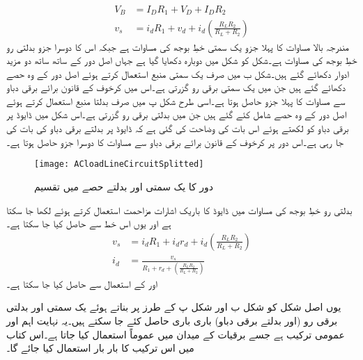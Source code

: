 \begin{align} \label{مساوات_ٹرانزسٹر_یکسمتی_بدلتا_بار_کے_خط}
V_B&=I_D R_1 +V_D+I_D R_2\\
v_s&=i_d R_1+v_d+i_d \left (\frac{R_L R_2}{R_L+R_2} \right )
\end{align}
مندرجہ بالا مساوات کا پہلا جزو یک سمتی خطِ بوجھ کی مساوات ہے جبکہ اس کا دوسرا جزو بدلتی رو خطِ بوجھ کی مساوات ہے۔شکل  کو شکل  میں دوبارہ دکھایا گیا ہے جہاں اصل دور کے ساتھ ساتھ دو مزید ادوار دکھائے گئے ہیں۔شکل  ب میں صرف  یک سمتی منبع  استعمال کرتے ہوئے اصل دور کے وہ حصے دکھائے گئے ہیں جن میں یک سمتی برقی رو  گزرتی ہے۔اس میں کرخوف کے قانون برائے برقی دباو سے مساوات  کا پہلا جزو حاصل ہوتا ہے۔اسی طرح شکل  پ میں صرف بدلتا منبع  استعمال کرتے ہوئے اصل دور کے وہ حصے شامل کئے گئے ہیں جن میں بدلتی برقی رو  گزرتی ہے۔اس شکل میں ڈایوڈ پر برقی دباو کو  لکھتے ہوئے اس بات کی وضاحت کی گئی ہے کہ ڈایوڈ پر بدلتے برقی دباو کی بات کی جا رہی ہے۔اس دور پر کرخوف کے قانون برائے برقی دباو سے مساوات   کا دوسرا جزو حاصل ہوتا ہے۔
\begin{figure}
\centering
\texttt{[image: ACloadLineCircuitSplitted]}
\caption{دور کا یک سمتی اور بدلتے حصے میں تقسیم }
\label{شکل_دور_کا_یکسمتی_اور_بدلتا_حصہ}
\end{figure}
بدلتی رو خطِ بوجھ کی مساوات میں ڈایوڈ کا باریک اشارات مزاحمت   استعمال کرتے ہوئے  لکھا جا سکتا ہے اور یوں اس خط سے   حاصل کیا جا سکتا ہے۔
\begin{align*}
v_s&=i_d R_1+i_d r_d + i_d \left (\frac{R_L R_2}{R_L+R_2} \right )\\
i_d&=\frac{v_s}{R_1+r_d+\left (\frac{R_L R_2}{R_L+R_2} \right )}
\end{align*}
اور   کے استعمال سے حاصل کیا جا سکتا ہے۔

یوں اصل شکل کو شکل  ب اور شکل  پ کے طرز پر بناتے ہوئے یک سمتی اور بدلتی برقی رو (اور بدلتے برقی دباو) باری باری حاصل کئے جا سکتے ہیں۔یہ نہایت اہم اور عمومی ترکیب ہے جسے برقیات کے میدان میں عموماً استعمال کیا جاتا ہے۔اس کتاب میں اس ترکیب کا بار بار استعمال کیا جائے گا۔ 

